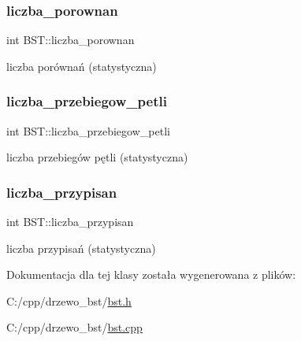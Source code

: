 \subsubsection{\texorpdfstring{liczba\+\_\+porownan}{liczba\_porownan}}
{\footnotesize\ttfamily int B\+S\+T\+::liczba\+\_\+porownan}

liczba porównań (statystyczna) \mbox{\label{class_b_s_t_abd1f7811c4077eecacb5a4ab2013ef53}} 
\subsubsection{\texorpdfstring{liczba\+\_\+przebiegow\+\_\+petli}{liczba\_przebiegow\_petli}}
{\footnotesize\ttfamily int B\+S\+T\+::liczba\+\_\+przebiegow\+\_\+petli}

liczba przebiegów pętli (statystyczna) \mbox{\label{class_b_s_t_a8d4e71cbb02976259d9893169ea2b6ac}} 
\subsubsection{\texorpdfstring{liczba\+\_\+przypisan}{liczba\_przypisan}}
{\footnotesize\ttfamily int B\+S\+T\+::liczba\+\_\+przypisan}

liczba przypisań (statystyczna) 

Dokumentacja dla tej klasy została wygenerowana z plików\+:\begin{DoxyCompactItemize}
\item 
C\+:/cpp/drzewo\+\_\+bst/\mbox{\hyperlink{bst_8h}{bst.\+h}}\item 
C\+:/cpp/drzewo\+\_\+bst/\mbox{\hyperlink{bst_8cpp}{bst.\+cpp}}\end{DoxyCompactItemize}
